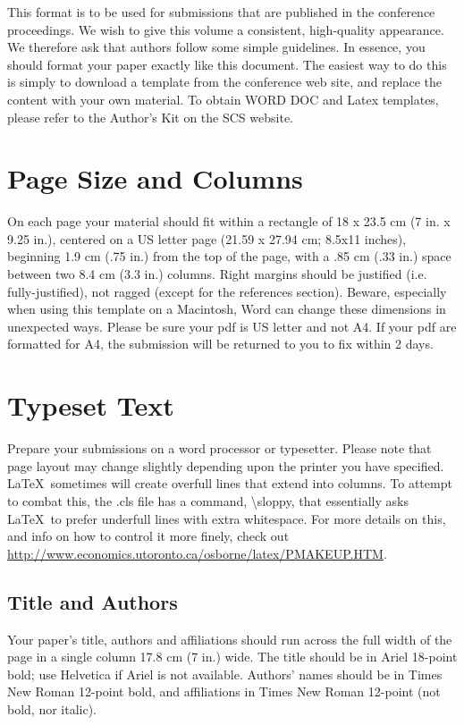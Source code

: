 \documentclass{scsSimAUDPaperFormat}
\begin{document}
This format is to be used for submissions that are published in the conference proceedings. We wish to give this volume a consistent, high-quality appearance. We therefore ask that authors follow some simple guidelines. In essence, you should format your paper exactly like this document. The easiest way to do this is simply to download a template from the conference web site, and replace the content with your own material. To obtain WORD DOC and Latex templates, please refer to the Author’s Kit on the SCS website.

\section{Page Size and Columns}

On each page your material should fit within a rectangle of 18 x 23.5 cm (7 in. x 9.25 in.), centered on a US letter page (21.59 x 27.94 cm; 8.5x11 inches), beginning 1.9 cm (.75 in.) from the top of the page, with a .85 cm (.33 in.) space between two 8.4 cm (3.3 in.) columns. Right margins should be justified (i.e. fully-justified), not ragged (except for the references section). Beware, especially when using this template on a Macintosh, Word can change these dimensions in unexpected ways. Please be sure your pdf is US letter and not A4. If your pdf are formatted for A4, the submission will be returned to you to fix within 2 days.

\section{Typeset Text}

Prepare your submissions on a word processor or typesetter. Please
note that page layout may change slightly depending upon the printer
you have specified. \LaTeX\ sometimes will create overfull lines
that extend into columns. To attempt to combat this, the .cls
file has a command, {\textbackslash}sloppy, that essentially asks
\LaTeX\ to prefer underfull lines with extra whitespace. For more
details on this, and info on how to control it more finely, check out
{\url{http://www.economics.utoronto.ca/osborne/latex/PMAKEUP.HTM}}.

\subsection{Title and Authors}

Your paper’s title, authors and affiliations should run across the full width of the page in a single column 17.8 cm (7 in.) wide. The title should be in Ariel 18-point bold; use Helvetica if Ariel is not available. Authors’ names should be in Times New Roman 12-point bold, and affiliations in Times New Roman 12-point (not bold, nor italic). 
\end{document}
